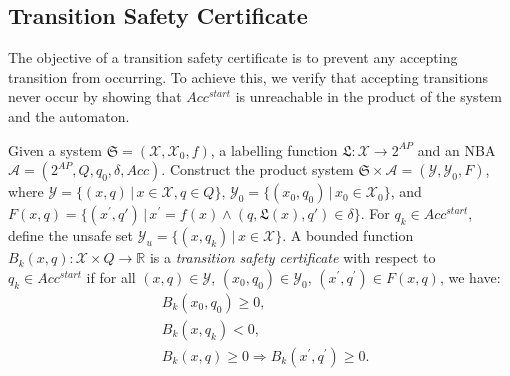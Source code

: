 \subsection{Transition Safety Certificate}

The objective of a transition safety certificate is to prevent any accepting transition from occurring. To achieve this, we verify that accepting transitions never occur by showing that $Acc^{start}$ is unreachable in the product of the system and the automaton.

\begin{definition}
  \label{transition-safety-certificate-definition}
  Given a system $\mathfrak{S} = (\mathcal{X}, \mathcal{X}_0, f)$, a labelling function $\mathfrak{L}:\mathcal{X} \rightarrow 2^{AP}$ and an NBA $\mathcal{A} = (2^{AP}, Q, q_0, \delta, Acc)$. Construct the product system $\mathfrak{S} \times \mathcal{A} = (\mathcal{Y}, \mathcal{Y}_0, F)$, where $\mathcal{Y} = \{(x, q) \,|\, x \in \mathcal{X}, q \in Q \}$, $\mathcal{Y}_0 = \{ (x_0, q_0) \,|\, x_0 \in \mathcal{X}_0 \}$, and $F(x,q) = \{(x^{\prime}, q') \,|\, x^{\prime} = f(x) \land (q, \mathfrak{L}(x), q') \in \delta\}$. For $q_k \in Acc^{start}$, define the unsafe set $\mathcal{Y}_u = \{(x, q_k) \,|\, x \in \mathcal{X}\}$. A bounded function $B_{k}(x, q): \mathcal{X} \times Q \rightarrow \mathbb{R}$ is a \emph{transition safety certificate} with respect to $q_k \in Acc^{start}$ if for all $(x,q) \in \mathcal{Y}$, $(x_0, q_0) \in \mathcal{Y}_0$, $(x^{\prime}, q^{\prime}) \in F(x, q)$, we have:
  \begin{align}
    &B_{k}(x_0, q_0) \geq 0, \label{btsc1} \\
    &B_{k}(x, q_k) < 0, \label{btsc2} \\
    &B_{k}(x, q) \geq 0 \Rightarrow B_{k}(x^{\prime}, q^{\prime}) \geq 0. \label{btsc3}
  \end{align}
\end{definition}


